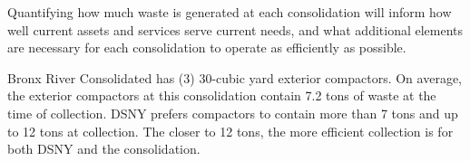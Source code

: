 
    Quantifying how much waste is generated at each consolidation will inform how well current assets and services serve current needs, and what additional elements are necessary for each consolidation to operate as efficiently as possible.
    
    Bronx River Consolidated has (3) 30-cubic yard exterior compactors. On average, the exterior compactors at this consolidation contain 7.2 tons of waste at the time of collection. DSNY prefers compactors to contain more than 7 tons and up to 12 tons at collection. The closer to 12 tons, the more efficient collection is for both DSNY and the consolidation.